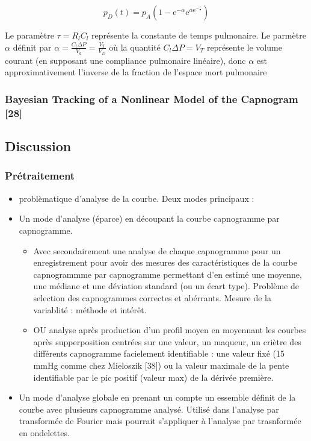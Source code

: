 \documentclass[12pt,]{article}
\providecommand{\tightlist}{%
  \setlength{\itemsep}{0pt}\setlength{\parskip}{0pt}}
\begin{document}
\[ 
p_{D}(t)=p_{A} (1-\mathrm{e}^{-\alpha} \mathrm{e}^{\alpha\mathrm{e}^{-\frac{t}{\tau}}})  
\tag{2}
\]

Le paramètre \(\tau=R_{l}C_{l}\) représente la constante de temps
pulmonaire. Le parmètre \(\alpha\) définit par
\(\alpha= \frac{C_{l}\Delta P}{V_{d}} =\frac{V_{T}}{V_{D}}\) où la
quantité \(C_{l}\Delta P=V_{T}\) représente le volume courant (en
supposant une compliance pulmonaire linéaire), donc \(\alpha\) est
approximativement l'inverse de la fraction de l'espace mort pulmonaire

\subsubsection{Bayesian Tracking of a Nonlinear Model of the Capnogram
{[}28{]}}\label{bayesian-tracking-of-a-nonlinear-model-of-the-capnogram-den2006bayesian}

\subsection{Discussion}\label{discussion}

\subsubsection{Prétraitement}\label{pretraitement}

\begin{itemize}
\item
  problèmatique d'analyse de la courbe. Deux modes principaux :
\item
  Un mode d'analyse (éparce) en découpant la courbe capnogramme par
  capnogramme.

  \begin{itemize}
  \tightlist
  \item
    Avec secondairement une analyse de chaque capnogramme pour un
    enregistrement pour avoir des mesures des caractéristiques de la
    courbe capnogrammme par capnogramme permettant d'en estimé une
    moyenne, une médiane et une déviation standard (ou un écart type).
    Problème de selection des capnogrammes correctes et abérrants.
    Mesure de la variablité : méthode et intérêt.
  \item
    OU analyse après production d'un profil moyen en moyennant les
    courbes après supperposition centrées sur une valeur, un maqueur, un
    criètre des différents capnogramme facielement identifiable : une
    valeur fixé (15 mmHg comme chez Mieloszik {[}38{]}) ou la valeur
    maximale de la pente identifiable par le pic positif (valeur max) de
    la dérivée première.
  \end{itemize}
\item
  Un mode d'analyse globale en prenant un compte un essemble définit de
  la courbe avec plusieurs capnogramme analysé. Utilisé dans l'analyse
  par transformée de Fourier mais pourrait s'appliquer à l'analyse par
  trasnformée en ondelettes.
\end{itemize}
\end{document}
